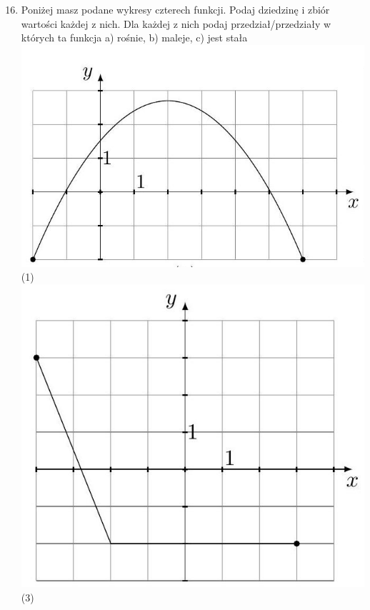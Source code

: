 \documentclass[10pt]{article}
\begin{document}
\begin{enumerate}
  \setcounter{enumi}{15}
  \item Poniżej masz podane wykresy czterech funkcji. Podaj dziedzinę i zbiór wartości każdej z nich. Dla każdej z nich podaj przedział/przedziały w których ta funkcja a) rośnie, b) maleje, c) jest stała\\
\includegraphics[max width=\textwidth, center]{2024_11_21_e9b4faa005d5be2cc318g-128(1)}\\
(1)\\
\includegraphics[max width=\textwidth, center]{2024_11_21_e9b4faa005d5be2cc318g-128(2)}\\
(3)\\

\end{enumerate}
\end{document}
